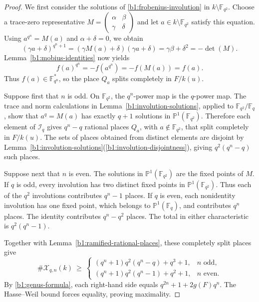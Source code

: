 \documentclass[10pt,a4paper]{amsart}
\numberwithin{equation}{section}
\newcommand{\F}{\mathbb F}
\newcommand{\PP}{\mathbb P}
\begin{document}
\begin{proof}
We first consider the solutions of \eqref{b1:frobenius-involution}
in \(k\setminus\F_{q^2}\). Choose a trace-zero representative
\(M=\left(\begin{smallmatrix}\alpha&\beta\\\gamma&\delta\end{smallmatrix}\right)\)
and let \(a\in k\setminus\F_{q^2}\) satisfy this equation.
Using \(a^{q^n}=M(a)\) and \(\alpha+\delta=0\), we obtain
\[
 (\gamma a+\delta)^{q^n+1}
 =(\gamma M(a)+\delta)(\gamma a+\delta)
 =\gamma\beta+\delta^2=-\det(M).
\]
Lemma~\ref{b1:mobius-identities} now yields
\[
 f(a)^{q^n}=-f(a^{q^n})=-f(M(a))=f(a).
\]
Thus \(f(a)\in\F_{q^n}^*\), so the place \(Q_a\) splits completely
in \(F/k(u)\).

Suppose first that \(n\) is odd.  On \(\F_{q^2}\), the
\(q^n\)-power map is the \(q\)-power map. The trace and norm calculations
in Lemma~\ref{b1:involution-solutions}, applied to \(\F_{q^2}/\F_q\),
show that \(a^q=M(a)\) has exactly \(q+1\) solutions in
\(\PP^1(\F_{q^2})\). Therefore each element of \(\mathcal I_q\)
gives \(q^n-q\) rational places \(Q_a\), with \(a\notin\F_{q^2}\),
that split completely in \(F/k(u)\). The sets of places obtained
from distinct elements are disjoint by
Lemma~\ref{b1:involution-solutions}(\ref{b1:involution-disjointness}), giving
\(q^2(q^n-q)\) such places.

Suppose next that \(n\) is even.  The solutions in
\(\PP^1(\F_{q^2})\) are the fixed points of \(M\).
If \(q\) is odd, every involution has two distinct fixed points in
\(\PP^1(\F_{q^2})\).  Thus each of the \(q^2\) involutions contributes
\(q^n-1\) places.  If \(q\) is even, each nonidentity involution has
one fixed point, which belongs to \(\PP^1(\F_q)\), and contributes
\(q^n\) places.  The identity contributes \(q^n-q^2\) places.
The total in either characteristic is \(q^2(q^n-1)\).

Together with Lemma~\ref{b1:ramified-rational-places}, these
completely split places give
\begin{equation}
\label{b1:rational-count}
 \#\mathcal X_{q,n}(k)\ \ge\
 \begin{cases}
 (q^n+1)q^2(q^n-q)+q^3+1,&n\text{ odd},\\
 (q^n+1)q^2(q^n-1)+q^2+1,&n\text{ even}.
 \end{cases}
\end{equation}
By \eqref{b1:genus-formula}, each right-hand side equals
\(q^{2n}+1+2g(F)q^n\). The Hasse--Weil bound forces
equality, proving maximality.
\end{proof}
\end{document}
